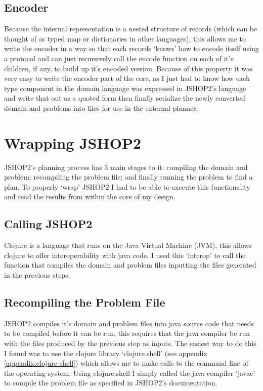 \subsection{Encoder}
Because the internal representation is a nested structure of records (which can
be thought of as typed map or dictionaries in other languages), this allows me
to write the encoder in a way so that each records `knows' how to encode itself
using a protocol and can just recursively call the encode function on each of
it's children, if any, to build up it's encoded version. Because of this
property it was very easy to write the encoder part of the core, as I just had
to know how each type component in the domain language was expressed in JSHOP2's
language and write that out as a quoted form then finally serialize the newly
converted domain and problems into files for use in the external planner.

\section{Wrapping JSHOP2}
JSHOP2's planning process has 3 main stages to it: compiling the domain and
problem; recompiling the problem file; and finally running the problem to find a
plan. To properly `wrap' JSHOP2 I had to be able to execute this functionality
and read the results from within the core of my design.

\subsection{Calling JSHOP2}
Clojure is a language that runs on the Java Virtual Machine (JVM), this allows
clojure to offer interoperability with java code. I used this `interop' to call
the function that compiles the domain and problem files inputting the files
generated in the previous steps.

\subsection{Recompiling the Problem File}
JSHOP2 compiles it's domain and problem files into java source code that needs
to be compiled before it can be run, this requires that the java compiler be run
with the files produced by the previous step as inputs. The easiest way to do
this I found was to use the clojure library `clojure.shell' (see appendix
\ref{appendix:clojure-shell}) which allows me to make calls to the command line
of the operating system. Using clojure.shell I simply called the java compiler
`javac' to compile the problem file as specified in JSHOP2's documentation.

